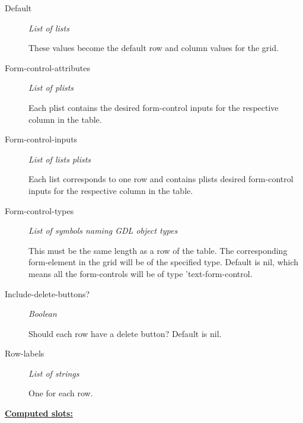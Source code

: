 \documentclass [11pt]{book}
\begin{document}
\begin{itemize}
\begin{description}

\item [Default]
\emph{List of lists}

 These values become the default row and column
values for the grid.




\item [Form-control-attributes]
\emph{List of plists}

 Each plist contains the desired form-control
inputs for the respective column in the table.




\item [Form-control-inputs]
\emph{List of lists plists}

 Each list corresponds to one row
and contains plists desired form-control inputs for the
respective column in the table.




\item [Form-control-types]
\emph{List of symbols naming GDL object types}

 This must be
the same length as a row of the table. The corresponding
form-element in the grid will be of the specified type.
Default is nil, which means all the form-controls will
be of type 'text-form-control.




\item [Include-delete-buttons?]
\emph{Boolean}

 Should each row have a delete button?
Default is nil.




\item [Row-labels]
\emph{List of strings}

 One for each row.




\end{description}






\textbf{
\underline{Computed slots:}}

\begin{description}


\end{description}
\end{itemize}
\end{document}
